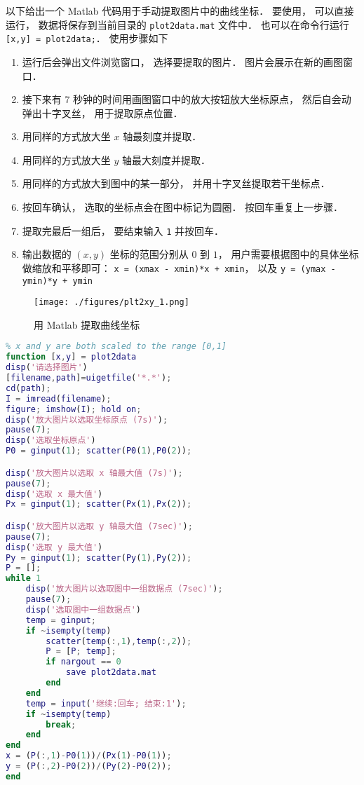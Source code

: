 

以下给出一个 Matlab 代码用于手动提取图片中的曲线坐标． 要使用， 可以直接运行， 数据将保存到当前目录的 \verb|plot2data.mat| 文件中． 也可以在命令行运行 \verb|[x,y] = plot2data;|． 使用步骤如下

\begin{enumerate}
\item 运行后会弹出文件浏览窗口， 选择要提取的图片． 图片会展示在新的画图窗口．
\item 接下来有 7 秒钟的时间用画图窗口中的放大按钮放大坐标原点， 然后自会动弹出十字叉丝， 用于提取原点位置．
\item 用同样的方式放大坐 $x$ 轴最刻度并提取．
\item 用同样的方式放大坐 $y$ 轴最大刻度并提取．
\item 用同样的方式放大到图中的某一部分， 并用十字叉丝提取若干坐标点．
\item 按回车确认， 选取的坐标点会在图中标记为圆圈． 按回车重复上一步骤．
\item 提取完最后一组后， 要结束输入 \verb|1| 并按回车．
\item 输出数据的 $(x, y)$ 坐标的范围分别从 $0$ 到 $1$， 用户需要根据图中的具体坐标做缩放和平移即可： \verb|x = (xmax - xmin)*x + xmin|， 以及 \verb|y = (ymax - ymin)*y + ymin|
\end{enumerate}

\begin{figure}[ht]
\centering
\texttt{[image: ./figures/plt2xy\_1.png]}
\caption{用 Matlab 提取曲线坐标} \label{plt2xy_fig1}
\end{figure}

\begin{lstlisting}[language=matlab]
% Data Extractor for Plot
% x and y are both scaled to the range [0,1]
function [x,y] = plot2data
disp('请选择图片')
[filename,path]=uigetfile('*.*');
cd(path);
I = imread(filename);
figure; imshow(I); hold on;
disp('放大图片以选取坐标原点 (7s)');
pause(7);
disp('选取坐标原点')
P0 = ginput(1); scatter(P0(1),P0(2));

disp('放大图片以选取 x 轴最大值 (7s)');
pause(7);
disp('选取 x 最大值')
Px = ginput(1); scatter(Px(1),Px(2));

disp('放大图片以选取 y 轴最大值 (7sec)');
pause(7);
disp('选取 y 最大值')
Py = ginput(1); scatter(Py(1),Py(2));
P = [];
while 1
    disp('放大图片以选取图中一组数据点 (7sec)');
    pause(7);
    disp('选取图中一组数据点')
    temp = ginput;
    if ~isempty(temp)
        scatter(temp(:,1),temp(:,2));
        P = [P; temp];
        if nargout == 0
            save plot2data.mat
        end
    end
    temp = input('继续:回车; 结束:1');
    if ~isempty(temp)
        break;
    end
end
x = (P(:,1)-P0(1))/(Px(1)-P0(1));
y = (P(:,2)-P0(2))/(Py(2)-P0(2));
end
\end{lstlisting}
